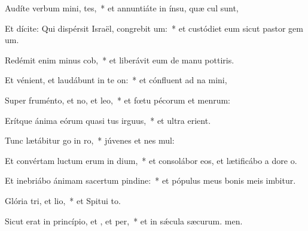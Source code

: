 \item Audíte verbum mini, tes,~* et annuntiáte in ínsu, quæ cul sunt,
\item Et dícite: Qui dispérsit Israël, congrebit um:~* et custódiet eum sicut pastor gem um.
\item Redémit enim minus cob,~* et liberávit eum de manu pottiris.
\item Et vénient, et laudábunt in te on:~* et cónfluent ad na mini,
\item Super fruménto, et no, et leo,~* et fœtu pécorum et menrum:
\item Erítque ánima eórum quasi tus irguus,~* et ultra  erient.
\item Tunc lætábitur go in ro,~* júvenes et nes mul:
\item Et convértam luctum erum in dium,~* et consolábor eos, et lætificábo a dore o.
\item Et inebriábo ánimam sacertum pindine:~* et pópulus meus bonis meis imbitur.
\item Glória tri, et lio,~* et Spitui to.
\item Sicut erat in princípio, et , et per,~* et in sǽcula sæcurum. men.
